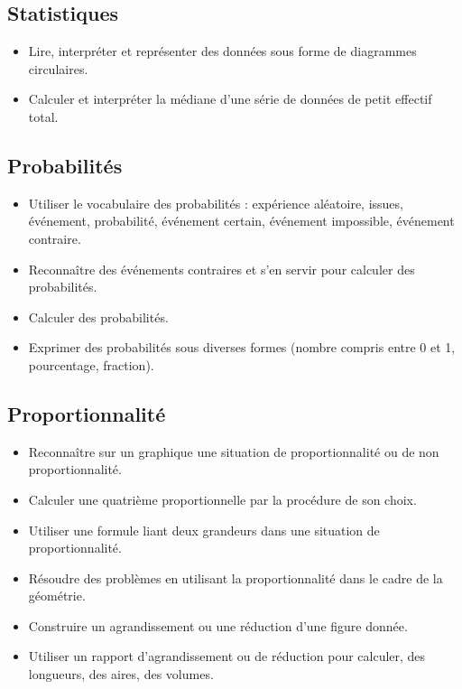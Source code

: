 \documentclass[a4paper,12pt,fleqn]{article}	
\begin{document}
\renewcommand{\labelitemi}{}

\subsection*{Statistiques}

\begin{itemize}
	\item {}Lire, interpréter et représenter des données sous forme de diagrammes circulaires.
	\item {}Calculer et interpréter la médiane d’une série de données de petit effectif total.
\end{itemize}

\subsection*{Probabilités}

\begin{itemize}
	\item {}Utiliser le vocabulaire des probabilités : expérience aléatoire, issues, événement, probabilité, événement certain, événement impossible, événement contraire.
	\item {}Reconnaître des événements contraires et s’en servir pour calculer des probabilités.
	\item {}Calculer des probabilités.
	\item {}Exprimer des probabilités sous diverses formes (nombre compris entre 0 et 1, pourcentage, fraction).
\end{itemize}

\subsection*{Proportionnalité}

\begin{itemize}
	\item {}Reconnaître sur un graphique une situation de proportionnalité ou de non proportionnalité.
	\item {}Calculer une quatrième proportionnelle par la procédure de son choix.
	\item {}Utiliser une formule liant deux grandeurs dans une situation de proportionnalité.
	\item {}Résoudre des problèmes en utilisant la proportionnalité dans le cadre de la géométrie.
	\item {}Construire un agrandissement ou une réduction d’une figure donnée.
	\item {}Utiliser un rapport d’agrandissement ou de réduction pour calculer, des longueurs, des aires, des volumes.
\end{itemize}
\end{document}
